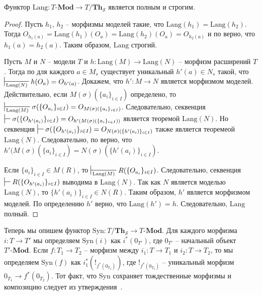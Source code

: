 \documentclass[reqno]{amsart}
\theoremstyle{definition}
\theoremstyle{remark}
\newcommand{\bcat}[1]{\mathbf{#1}}
\newcommand{\Mod}[1]{#1\text{-}\bcat{Mod}}
\newcommand{\fs}[1]{\mathrm{#1}}
\newcommand{\Lang}{\fs{Lang}}
\newcommand{\Syn}{\fs{Syn}}
\newcommand{\Th}{\bcat{Th}}
\begin{document}
\begin{prop}[lang-ff]
Функтор $\Lang : \Mod{T} \to T/\Th_\mathcal{S}$ является полным и строгим.
\end{prop}
\begin{proof}
Пусть $h_1$, $h_2$ -- морфизмы моделей такие, что $\Lang(h_1) = \Lang(h_2)$.
Тогда $O_{h_1(a)} = \Lang(h_1)(O_a) = \Lang(h_2)(O_a) = O_{h_2(a)}$ и по  верно, что $h_1(a) = h_2(a)$.
Таким образом, $\Lang$ строгий.

Пусть $M$ и $N$ -- модели $T$ и $h : \Lang(M) \to \Lang(N)$ -- морфизм расширений $T$.
Тогда по  для каждого $a \in M_s$ существует уникальный $h'(a) \in N_s$ такой, что $\sststile{\Lang(N)}{} h(O_a) = O_{h'(a)}$.
Докажем, что $h' : M \to N$ является морфизмом моделей.
Действительно, если $M(\sigma)(\{ a_i \}_{i \in I})$ определено, то $\sststile{\Lang(M)}{} \sigma(\{ O_{a_i} \}_{i \in I}) = O_{M(\sigma)(\{ a_i \}_{i \in I})}$.
Следовательно, секвенция $\sststile{}{} \sigma(\{ O_{h'(a_i)} \}_{i \in I}) = O_{h'(M(\sigma)(\{ a_i \}_{i \in I}))}$ является теоремой $\Lang(N)$.
Но секвенция $\sststile{}{} \sigma(\{ O_{h'(a_i)} \}_{i \in I}) = O_{N(\sigma)(\{ h'(a_i) \}_{i \in I})}$ также является теоремеой $\Lang(N)$.
Следовательно, по  верно, что $h'(M(\sigma)(\{ a_i \}_{i \in I}) = N(\sigma)(\{ h'(a_i) \}_{i \in I})$.

Если $\{ a_i \}_{i \in I} \in M(R)$, то $\sststile{\Lang(M)}{} R(\{ O_{a_i} \}_{i \in I})$.
Следовательно, секвенция $\sststile{}{} R(\{ O_{h'(a_i)} \}_{i \in I})$ выводима в $\Lang(N)$.
Так как $N$ является моделью $\Lang(N)$, то $\{ h'(a_i) \}_{i \in I} \in N(R)$.
Таким образом, $h'$ является морфизмом моделей.
По определению $h'$ верно, что $\Lang(h') = h$.
Следовательно, $\Lang$ полный.
\end{proof}

Теперь мы опишем функтор $\Syn : T/\Th_\mathcal{S} \to \Mod{T}$.
Для каждого морфизма $i : T \to T'$ мы определяем $\Syn(i)$ как $i^*(0_{T'})$, где $0_{T'}$ -- начальный объект $\Mod{T'}$.
Если $f : T_1 \to T_2$ -- морфизм между $i_1 : T \to T_1$ и $i_2 : T \to T_2$, то мы определяем $\Syn(f)$ как $i_1^*(!_{f^*(0_{T_2})})$, где $!_{f^*(0_{T_2})}$ -- уникальный морфизм $0_{T_1} \to f^*(0_{T_2})$.
Тот факт, что $\Syn$ сохраняет тождественные морфизмы и композицию следует из утверждения~.
\end{document}
